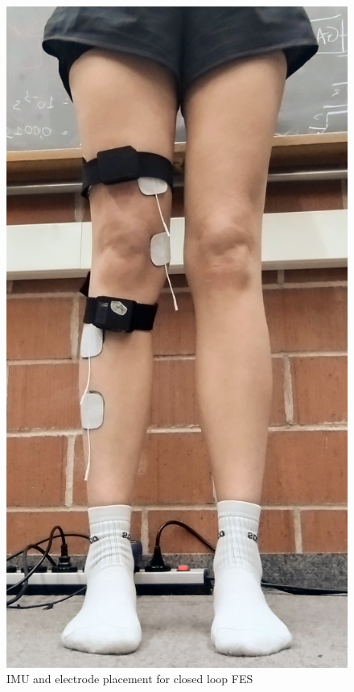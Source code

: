 \begin{figure}
    \centering
    \includegraphics[width=\linewidth]{images/clsetupimg.jpg}
    \caption{IMU and electrode placement for closed loop FES}
    \label{fig:clsetupimg}
\end{figure}

